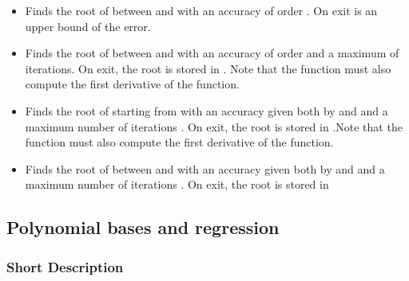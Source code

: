\begin{itemize}

\item {}
  \sshortdescribe Finds the root of  between  and  with
  an accuracy of order . On exit  is an upper bound of the
  error.
  
\item {}
  \sshortdescribe Finds the root of  between  and  with
  an accuracy of order  and a maximum of  iterations. On
  exit, the root is stored in . Note that the function  must
  also compute the first derivative of the function.
  

\item {}
  \sshortdescribe Finds the root of  starting from  with an
  accuracy given both by  and  and a maximum number of
  iterations . On exit, the root is stored in .Note that
  the function  must also compute the first derivative of the function.
  


\item {}
  \sshortdescribe Finds the root of  between  and  with
  an accuracy given both by  and  and a maximum number
  of iterations . On exit, the root is stored in 
\end{itemize}


\subsection{Polynomial bases and regression}
\subsubsection{Short Description}


